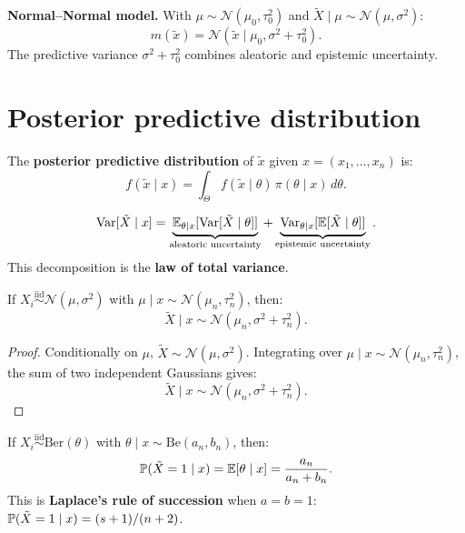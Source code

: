 \begin{example}
\textbf{Normal--Normal model.}
With $\mu \sim \mathcal{N}(\mu_0, \tau_0^2)$ and
$\tilde{X} \mid \mu \sim \mathcal{N}(\mu, \sigma^2)$:
\[
  m(\tilde{x}) = \mathcal{N}(\tilde{x} \mid \mu_0, \sigma^2 + \tau_0^2).
\]
The predictive variance $\sigma^2 + \tau_0^2$ combines aleatoric and
epistemic uncertainty.
\end{example}

\section{Posterior predictive distribution}

\begin{definition}
The \textbf{posterior predictive distribution} of $\tilde{x}$ given
$x = (x_1, \ldots, x_n)$ is:
\[
  f(\tilde{x} \mid x) = \int_\Theta f(\tilde{x} \mid \theta)\,\pi(\theta \mid x)\,d\theta.
\]
\end{definition}

\begin{keyformulas}[title=\textbf{Predictive variance decomposition}]
\[
  \mathrm{Var}[\tilde{X} \mid x]
  = \underbrace{\mathbb{E}_{\theta \mid x}[\mathrm{Var}[\tilde{X} \mid \theta]]}_{\text{aleatoric uncertainty}}
  + \underbrace{\mathrm{Var}_{\theta \mid x}[\mathbb{E}[\tilde{X} \mid \theta]]}_{\text{epistemic uncertainty}}.
\]
This decomposition is the \textbf{law of total variance}.
\end{keyformulas}

\begin{theorem}
If $X_i \overset{\text{iid}}{\sim} \mathcal{N}(\mu, \sigma^2)$ with
$\mu \mid x \sim \mathcal{N}(\mu_n, \tau_n^2)$, then:
\[
  \tilde{X} \mid x \sim \mathcal{N}(\mu_n, \sigma^2 + \tau_n^2).
\]
\end{theorem}

\begin{proof}
Conditionally on $\mu$, $\tilde{X} \sim \mathcal{N}(\mu, \sigma^2)$.
Integrating over $\mu \mid x \sim \mathcal{N}(\mu_n, \tau_n^2)$, the
sum of two independent Gaussians gives:
\[
  \tilde{X} \mid x \sim \mathcal{N}(\mu_n, \sigma^2 + \tau_n^2).
\]
\end{proof}

\begin{theorem}
If $X_i \overset{\text{iid}}{\sim} \text{Ber}(\theta)$ with
$\theta \mid x \sim \text{Be}(a_n, b_n)$, then:
\[
  \mathbb{P}(\tilde{X} = 1 \mid x) = \mathbb{E}[\theta \mid x] = \frac{a_n}{a_n + b_n}.
\]
This is \textbf{Laplace's rule of succession} when $a = b = 1$:
$\mathbb{P}(\tilde{X} = 1 \mid x) = (s+1)/(n+2)$.
\end{theorem}

